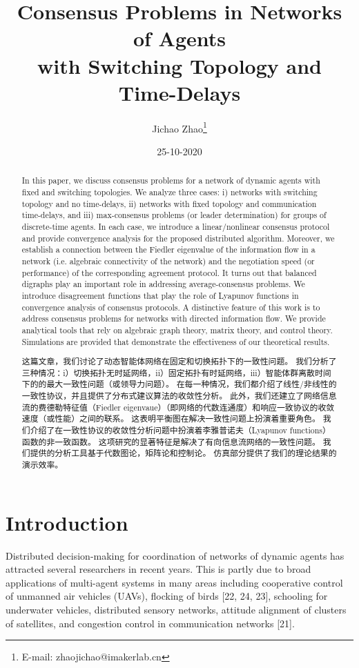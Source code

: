 \documentclass{article}
\title{Consensus Problems in Networks of Agents\\ with Switching Topology and Time-Delays}
\author{ Jichao Zhao\thanks{E-mail: zhaojichao@imakerlab.cn}}
\date{25-10-2020}
\begin{document}
\maketitle
\tableofcontents


\begin{abstract}
{\color[gray]{0.5}
In this paper, we discuss consensus problems for a network of dynamic agents with ﬁxed and switching topologies. 
We analyze three cases: i) networks with switching topology and no time-delays, ii) networks with ﬁxed topology and communication time-delays, and iii) max-consensus problems (or leader determination) for groups of discrete-time agents. 
In each case, we introduce a linear/nonlinear consensus protocol and provide convergence analysis for the proposed distributed algorithm. 
Moreover, we establish a connection between the Fiedler eigenvalue of the information ﬂow in a network (i.e. algebraic connectivity of the network) and the negotiation speed (or performance) of the corresponding agreement protocol. 
It turns out that balanced digraphs play an important role in addressing average-consensus problems. 
We introduce disagreement functions that play the role of Lyapunov functions in convergence analysis of consensus protocols. 
A distinctive feature of this work is to address consensus problems for networks with directed information ﬂow. 
We provide analytical tools that rely on algebraic graph theory, matrix theory, and control theory. 
Simulations are provided that demonstrate the eﬀectiveness of our theoretical results.
}

这篇文章，我们讨论了动态智能体网络在固定和切换拓扑下的一致性问题。
我们分析了三种情况：i）切换拓扑无时延网络，ii）固定拓扑有时延网络，iii）智能体群离散时间下的的最大一致性问题（或领导力问题）。
在每一种情况，我们都介绍了线性/非线性的一致性协议，并且提供了分布式建议算法的收敛性分析。
此外，我们还建立了网络信息流的费德勒特征值（Fiedler eigenvaue）（即网络的代数连通度）和响应一致协议的收敛速度（或性能）之间的联系。
这表明平衡图在解决一致性问题上扮演着重要角色。
我们介绍了在一致性协议的收敛性分析问题中扮演着李雅普诺夫（Lyapunov functions）函数的非一致函数。
这项研究的显著特征是解决了有向信息流网络的一致性问题。
我们提供的分析工具基于代数图论，矩阵论和控制论。
仿真部分提供了我们的理论结果的演示效率。
\end{abstract}

\section{Introduction}
{\color[gray]{0.5}
Distributed decision-making for coordination of networks of dynamic agents has attracted several researchers in recent years. 
This is partly due to broad applications of multi-agent systems in many areas including cooperative control of unmanned air vehicles (UAVs), ﬂocking of birds [22, 24, 23], schooling for underwater vehicles, distributed sensory networks, attitude alignment of clusters of satellites, and congestion control in communication networks [21].
}
\end{document}
